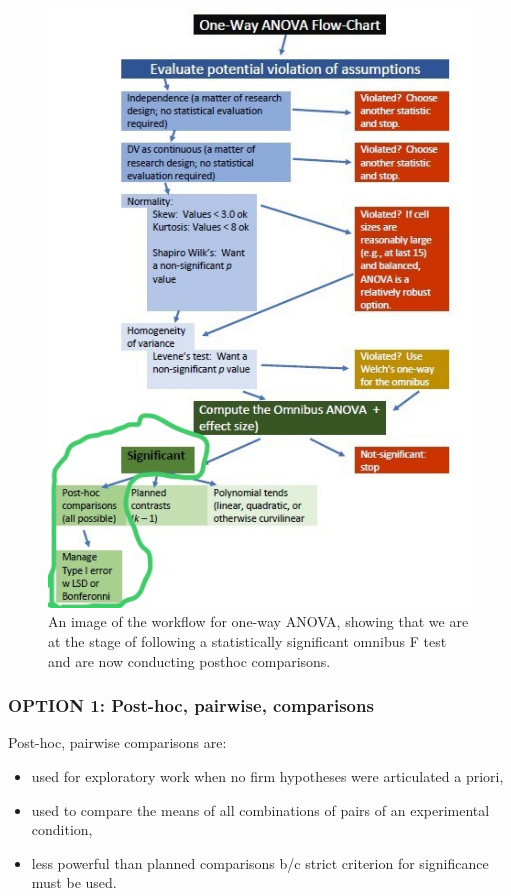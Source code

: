 \documentclass[
  english,
]{book}
\providecommand{\tightlist}{%
  \setlength{\itemsep}{0pt}\setlength{\parskip}{0pt}}
\begin{document}
\begin{figure}
\centering
\includegraphics{images/OnewayWrkFlw_phoc.jpg}
\caption{An image of the workflow for one-way ANOVA, showing that we are at the stage of following a statistically significant omnibus F test and are now conducting posthoc comparisons.}
\end{figure}

\hypertarget{option-1-post-hoc-pairwise-comparisons}{%
\subsubsection{OPTION 1: Post-hoc, pairwise, comparisons}\label{option-1-post-hoc-pairwise-comparisons}}

Post-hoc, pairwise comparisons are:

\begin{itemize}
\tightlist
\item
  used for exploratory work when no firm hypotheses were articulated a priori,
\item
  used to compare the means of all combinations of pairs of an experimental condition,
\item
  less powerful than planned comparisons b/c strict criterion for significance must be used.
\end{itemize}
\end{document}
